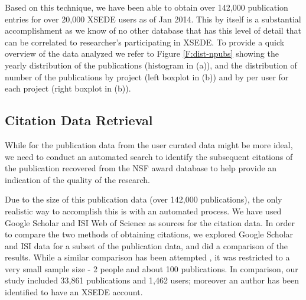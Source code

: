\documentclass{sig-alternate}
\begin{document}
Based on this technique, we have been able to obtain over 142,000
publication entries for over 20,000 XSEDE users as of Jan 2014.  This
by itself is a substantial accomplishment as we know of no other
database that has this level of detail that can be correlated to
researcher's participating in XSEDE. To provide a quick overview of
the data analyzed we refer to Figure \ref{F:dist-npubs} showing the
yearly distribution of the publications (histogram in (a)), and the
distribution of number of the publications by project (left boxplot in
(b)) and by per user for each project (right boxplot in (b)).
 
\subsection{Citation Data Retrieval} 
 
While for the publication data from the user curated data might be
more ideal, we need to conduct an automated search to identify the
subsequent citations of the publication recovered from the NSF award
database to help provide an indication of the quality of the research.

Due to the size of this publication data (over 142,000 publications),
the only realistic way to accomplish this is with an automated
process. We have used Google Scholar and ISI Web of Science as sources
for the citation data. In order to compare the two methods of
obtaining citations, we explored Google Scholar and ISI data for a
subset of the publication data, and did a comparison of the
results. While a similar comparison has been attempted
\cite{yang2006citation}, it was restricted to a very small sample size
- 2 people and about 100 publications. In comparison, our study
included 33,861 publications and 1,462 users; moreover an author has
been identified to have an XSEDE account.
\end{document}
